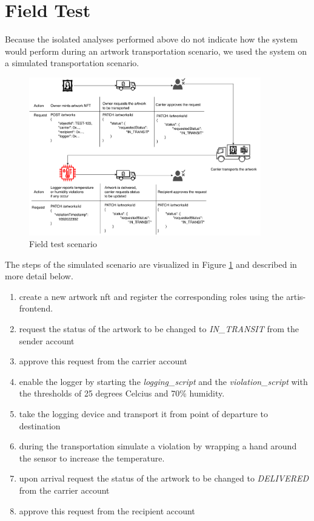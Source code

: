 \section{Field Test}
\label{sec:field_test}
Because the isolated analyses performed above do not indicate how the system would perform during an artwork transportation scenario, we used the system on a simulated transportation scenario.

\begin{figure}[ht]
    \centering
    \includegraphics[width=0.9\textwidth]{diagrams/evaluation_scenario_v2.drawio.pdf}
    \caption{Field test scenario}
    \label{fig:eval_scenario}
\end{figure}

The steps of the simulated scenario are visualized in Figure \ref{fig:eval_scenario} and described in more detail below.

\begin{enumerate}
    \item create a new artwork \gls{nft} and register the corresponding roles using the artis-frontend.
    \item request the status of the artwork to be changed to \textit{IN\_TRANSIT} from the sender account
    \item approve this request from the carrier account
    \item enable the logger by starting the \textit{logging\_script} and the \textit{violation\_script} with the thresholds of 25 degrees Celcius and 70\% humidity.
    \item take the logging device and transport it from point of departure to destination
    \item during the transportation simulate a violation by wrapping a hand around the sensor to increase the temperature.
    \item upon arrival request the status of the artwork to be changed to \textit{DELIVERED} from the carrier account
    \item approve this request from the recipient account
\end{enumerate}

